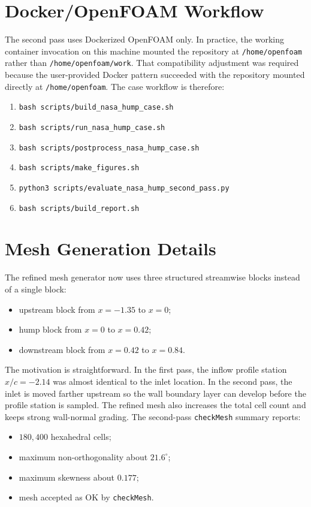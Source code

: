 \documentclass[11pt]{article}
\begin{document}
\section{Docker/OpenFOAM Workflow}
The second pass uses Dockerized OpenFOAM only. In practice, the working container invocation on this machine mounted the repository at \texttt{/home/openfoam} rather than \texttt{/home/openfoam/work}. That compatibility adjustment was required because the user-provided Docker pattern succeeded with the repository mounted directly at \texttt{/home/openfoam}. The case workflow is therefore:
\begin{enumerate}
\item \texttt{bash scripts/build\_nasa\_hump\_case.sh}
\item \texttt{bash scripts/run\_nasa\_hump\_case.sh}
\item \texttt{bash scripts/postprocess\_nasa\_hump\_case.sh}
\item \texttt{bash scripts/make\_figures.sh}
\item \texttt{python3 scripts/evaluate\_nasa\_hump\_second\_pass.py}
\item \texttt{bash scripts/build\_report.sh}
\end{enumerate}

\section{Mesh Generation Details}
The refined mesh generator now uses three structured streamwise blocks instead of a single block:
\begin{itemize}
\item upstream block from \(x=-1.35\) to \(x=0\);
\item hump block from \(x=0\) to \(x=0.42\);
\item downstream block from \(x=0.42\) to \(x=0.84\).
\end{itemize}

The motivation is straightforward. In the first pass, the inflow profile station \(x/c=-2.14\) was almost identical to the inlet location. In the second pass, the inlet is moved farther upstream so the wall boundary layer can develop before the profile station is sampled. The refined mesh also increases the total cell count and keeps strong wall-normal grading. The second-pass \texttt{checkMesh} summary reports:
\begin{itemize}
\item \(180{,}400\) hexahedral cells;
\item maximum non-orthogonality about \(21.6^\circ\);
\item maximum skewness about \(0.177\);
\item mesh accepted as OK by \texttt{checkMesh}.
\end{itemize}
\end{document}
